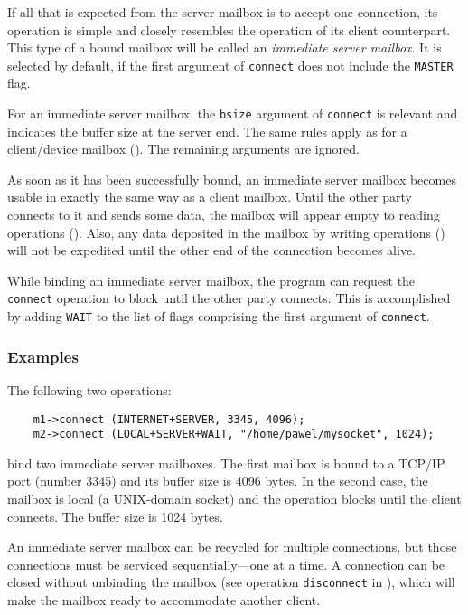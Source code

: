 If all that is expected from the server mailbox is to accept one connection,
its operation is simple and closely resembles the operation of its
client counterpart.
This type of a bound mailbox will be called an {\em immediate server mailbox}.
It is selected by default, if the first argument of {\tt connect}
does not include the {\tt MASTER} flag.

For an immediate server mailbox, the {\tt bsize} argument of {\tt connect}
is relevant and indicates the buffer size at the server end.
The same rules apply as for a client/device mailbox
().
The remaining arguments are ignored.

As soon as it has been successfully bound, an immediate server mailbox
becomes usable in exactly the same way as a client mailbox.
Until the other party connects to it and sends some data, the mailbox
will appear empty to reading operations ().
Also, any data deposited in the mailbox by writing operations
() will not be expedited until the other end of the
connection becomes alive.

While binding an immediate server mailbox, the program can
request the {\tt connect} operation to block until the other party connects.
This is accomplished by adding {\tt WAIT} to the list of flags
comprising the first argument of {\tt connect}.

\subsubsection*{Examples}

\noindent
The following two operations:
\begin{verbatim}
    m1->connect (INTERNET+SERVER, 3345, 4096);
    m2->connect (LOCAL+SERVER+WAIT, "/home/pawel/mysocket", 1024);
\end{verbatim}
bind two immediate server mailboxes.
The first mailbox is bound to a TCP/IP port (number 3345) and its buffer
size is 4096 bytes.
In the second case, the mailbox is local (a UNIX-domain socket) and the
operation blocks until the client connects.
The buffer size is 1024 bytes.

\medskip

\noindent
An immediate server mailbox can be recycled for multiple connections,
but those connections must be serviced sequentially---one at a time.
A connection can be closed without unbinding the
mailbox (see operation {\tt disconnect} in ),
which will make the mailbox ready to accommodate another client.


